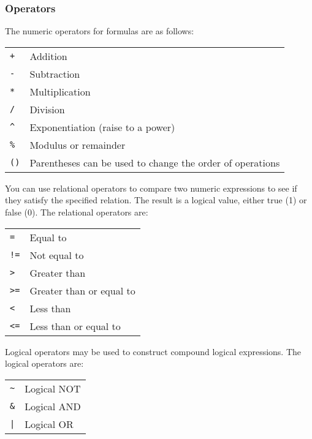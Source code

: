 \documentclass[titlepage]{article}
\newcommand{\twiddle}{\texttt{\~{}}}  %
\begin{document}
\subsubsection{Operators}

The numeric operators for formulas are as follows:

\vspace{6pt}
\begin{tabular}{ll}
 \texttt{+} & Addition\\
 \texttt{-} & Subtraction\\
 \texttt{*} & Multiplication\\
 \texttt{/} & Division\\
 \texttt{\^{}} & Exponentiation (raise to a power)\\
 \texttt{\%} & Modulus or remainder\\
 \texttt{()} & Parentheses can be used to change the order of operations
\end{tabular}
\vspace{6pt}

You can use relational operators to compare two numeric expressions to
see if they satisfy the specified relation.  The result is a logical
value, either true (1) or false (0).  The relational operators are:

\vspace{6pt}
\begin{tabular}{ll}
\texttt{=} & Equal to\\
\texttt{!=} & Not equal to\\
\texttt{>} & Greater than\\
\texttt{>=} & Greater than or equal to\\
\texttt{<} & Less than\\
\texttt{<=} & Less than or equal to
\end{tabular}
\vspace{6pt}

Logical operators may be used to construct compound logical expressions.
The logical operators are:
\label{logical_ops}

\vspace{6pt}
\begin{tabular}{ll}
\twiddle & Logical NOT\\
\texttt{\&} & Logical AND\\
\texttt{|} & Logical OR\\
\end{tabular}
\vspace{6pt}
\end{document}

